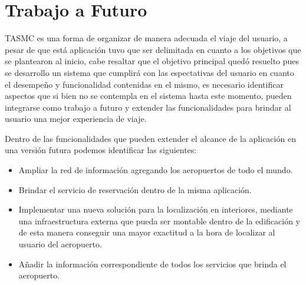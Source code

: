 
\chapter{Trabajo a Futuro} %

\label{TrabajoFuturo} %


TASMC es una forma de organizar de manera adecuada el viaje del usuario, a pesar de que está aplicación tuvo que ser delimitada en  
cuanto a los objetivos que se plantearon al inicio, cabe resaltar que el objetivo principal quedó resuelto pues se desarrollo un sistema
que cumplirá con las espectativas del usuario en cuanto el desempeño y funcionalidad contenidas en el mismo, es necesario identificar aspectos 
que si bien no se contempla en el sistema hasta este momento, pueden integrarse como trabajo a futuro y extender las funcionalidades 
para brindar al usuario una mejor experiencia de viaje.

Dentro de las funcionalidades que pueden extender el alcance de la aplicación en una versión futura podemos identificar las 
siguientes: 

\begin{itemize}
 \item Ampliar la red de información agregando los aeropuertos de todo el mundo.
 \item Brindar el servicio de reservación dentro de la misma aplicación.
 \item Implementar una nueva solución para la localización en interiores, mediante una infraestructura externa que pueda ser 
 montable dentro de la edificación y de esta manera conseguir una mayor exactitud a la hora de localizar al usuario del aeropuerto.
 \item Añadir la información correspondiente de todos los servicios que brinda el aeropuerto.
\end{itemize}
